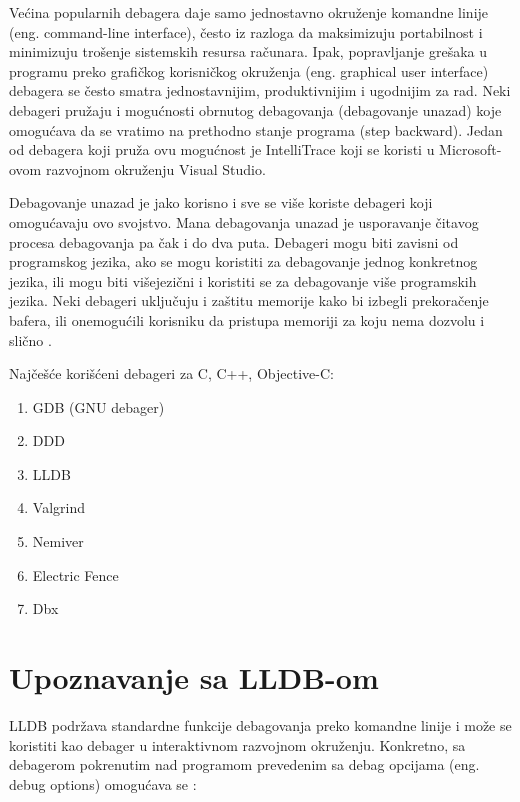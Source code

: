 \documentclass[a4paper]{article}
\begin{document}
Većina popularnih debagera daje samo jednostavno okruženje komandne linije (eng. command-line interface), često iz razloga da maksimizuju portabilnost i minimizuju trošenje sistemskih resursa računara. Ipak, popravljanje grešaka u programu preko grafičkog korisničkog okruženja (eng. graphical user interface) debagera se često smatra jednostavnijim, produktivnijim i ugodnijim za rad. Neki debageri pružaju i mogućnosti obrnutog debagovanja (debagovanje unazad) koje omogućava da se vratimo na prethodno stanje programa (step backward). Jedan od debagera koji pruža ovu mogućnost je IntelliTrace koji se koristi u Microsoft-ovom razvojnom okruženju Visual Studio. 

Debagovanje unazad je jako korisno i sve se više koriste debageri koji omogućavaju ovo svojstvo. Mana debagovanja unazad je usporavanje čitavog procesa debagovanja pa čak i do dva puta. Debageri mogu biti zavisni od programskog jezika, ako se mogu koristiti za debagovanje jednog konkretnog jezika, ili mogu biti višejezični i koristiti se za debagovanje više programskih jezika. Neki debageri uključuju i zaštitu memorije kako bi izbegli prekoračenje bafera, ili onemogućili korisniku da pristupa memoriji za koju nema dozvolu i slično \cite{ssq_debug_def}.

Najčešće korišćeni debageri za  C, C++, Objective-C\cite{ll_best_debuggers}\cite{up_best_debuggers}:
\begin{enumerate}
	\item GDB (GNU debager)
	\item DDD
	\item LLDB
	\item Valgrind
	\item Nemiver
	\item Electric Fence
	\item Dbx
\end{enumerate}

\section{Upoznavanje sa LLDB-om}
LLDB podržava standardne funkcije debagovanja preko komandne linije i može se
koristiti kao debager u interaktivnom razvojnom okruženju. Konkretno, sa
debagerom pokrenutim nad programom prevedenim sa debag opcijama (eng. debug
options) omogućava se \cite{lldb_to_gdb_map}:
\end{document}

